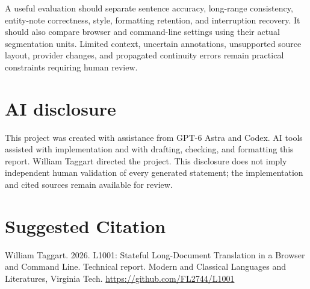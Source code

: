 \documentclass[manuscript,screen,nonacm]{acmart}
\begin{document}
A useful evaluation should separate sentence accuracy, long-range consistency, entity-note correctness, style, formatting retention, and interruption recovery. It should also compare browser and command-line settings using their actual segmentation units. Limited context, uncertain annotations, unsupported source layout, provider changes, and propagated continuity errors remain practical constraints requiring human review.

\FloatBarrier
\section{AI disclosure}

This project was created with assistance from GPT-6 Astra and Codex. AI tools assisted with implementation and with drafting, checking, and formatting this report. William Taggart directed the project. This disclosure does not imply independent human validation of every generated statement; the implementation and cited sources remain available for review.




\section*{Suggested Citation}
William Taggart. 2026. L1001: Stateful Long-Document Translation in a Browser and Command Line. Technical report. Modern and Classical Languages and Literatures, Virginia Tech.
\url{https://github.com/FL2744/L1001}
\end{document}
